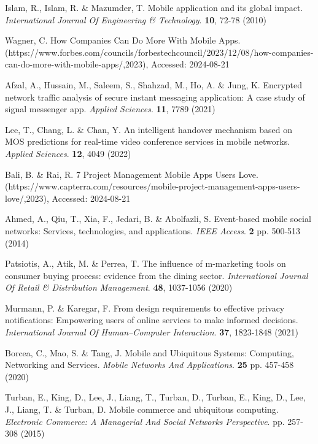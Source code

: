 \documentclass[preprint,12pt,number]{elsarticle}
\begin{document}
%
% 
%

\begin{thebibliography}{00}
Islam, R., Islam, R. \& Mazumder, T. Mobile application and its global impact. {\em International Journal Of Engineering \& Technology}. \textbf{10}, 72-78 (2010)

Wagner, C. How Companies Can Do More With Mobile Apps. (https://www.forbes.com/councils/forbestechcouncil/2023/12/08/how-companies-can-do-more-with-mobile-apps/,2023), Accessed: 2024-08-21

Afzal, A., Hussain, M., Saleem, S., Shahzad, M., Ho, A. \& Jung, K. Encrypted network traffic analysis of secure instant messaging application: A case study of signal messenger app. {\em Applied Sciences}. \textbf{11}, 7789 (2021)

Lee, T., Chang, L. \& Chan, Y. An intelligent handover mechanism based on MOS predictions for real-time video conference services in mobile networks. {\em Applied Sciences}. \textbf{12}, 4049 (2022)

Bali, B. \& Rai, R. 7 Project Management Mobile Apps Users Love. (https://www.capterra.com/resources/mobile-project-management-apps-users-love/,2023), Accessed: 2024-08-21

Ahmed, A., Qiu, T., Xia, F., Jedari, B. \& Abolfazli, S. Event-based mobile social networks: Services, technologies, and applications. {\em IEEE Access}. \textbf{2} pp. 500-513 (2014)

Patsiotis, A., Atik, M. \& Perrea, T. The influence of m-marketing tools on consumer buying process: evidence from the dining sector. {\em International Journal Of Retail \& Distribution Management}. \textbf{48}, 1037-1056 (2020)

Murmann, P. \& Karegar, F. From design requirements to effective privacy notifications: Empowering users of online services to make informed decisions. {\em International Journal Of Human–Computer Interaction}. \textbf{37}, 1823-1848 (2021)

Borcea, C., Mao, S. \& Tang, J. Mobile and Ubiquitous Systems: Computing, Networking and Services. {\em Mobile Networks And Applications}. \textbf{25} pp. 457-458 (2020)

Turban, E., King, D., Lee, J., Liang, T., Turban, D., Turban, E., King, D., Lee, J., Liang, T. \& Turban, D. Mobile commerce and ubiquitous computing. {\em Electronic Commerce: A Managerial And Social Networks Perspective}. pp. 257-308 (2015)


\end{thebibliography}
\end{document}
